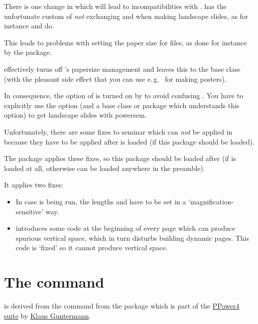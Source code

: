 There is one change in  which will lead to incompatibilities with .  has the
unfortunate custom of \emph{not} exchanging  and  when making landscape
slides, as for instance  and  do.

This leads to problems with setting the paper size for  files, as done for instance by the 
package. 

 effectively turns off 's papersize management and leaves this to the base class (with the
pleasant side effect that you can use e.\,g.\  for making posters). 

In consequence, the  option of  is turned on by  to avoid confusing
. You have to explicitly use the  option (and a base class or package which understands
this option) to get landscape slides with powersem.

Unfortunately, there are some fixes to seminar which can \emph{not} be applied in  because they have to
be applied after  is loaded (if this package should be loaded).

The package  applies these fixes, so this package should be loaded after  (if
 is loaded at all, otherwise  can be loaded anywhere in the preamble).

\newslide

It applies two fixes:
\begin{itemize}
\item In case  is being run, the lengths  and  have to
  be set in a `magnification-sensitive' way.

\item {} introduces some code at the beginning of every page which can produce spurious vertical space,
  which in turn disturbs building dynamic pages. This code is `fixed' so it cannot produce vertical space.
\end{itemize}


\newslide

%
\section{The  command}\label{Sec:pause}
 is derived from the  command from the package
\href{http://www-sp.iti.informatik.tu-darmstadt.de/software/ppower4/pp4sty.zip}{} which is part of the
\href{http://www-sp.iti.informatik.tu-darmstadt.de/software/ppower4/}{PPower4 suite} by
\href{mailto:guntermann@iti.informatik.tu-darmstadt.de}{Klaus Guntermann}.
  
